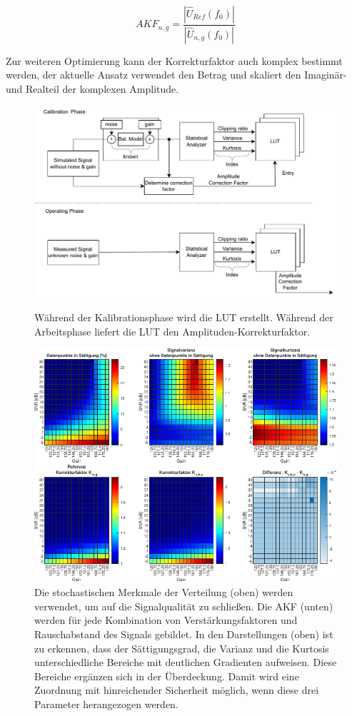 \begin{equation}
	\label{eq:corr}
	AKF_{n,g} = \frac{|\hat{U}_{Ref}(f_0)|}{|\hat{U}_{n,g}(f_0)|}
\end{equation}

Zur weiteren Optimierung kann der Korrekturfaktor auch komplex bestimmt werden, der aktuelle Ansatz verwendet den Betrag und skaliert den Imaginär- und Realteil der komplexen Amplitude.

\begin{figure}[h!]
	\centering
	\includegraphics[width=.85\textwidth]{../img/factor.pdf}
	\caption{Während der Kalibrationsphase wird die LUT erstellt. Während der Arbeitsphase liefert die LUT den Amplituden-Korrekturfaktor.}
	\label{fig:factor_eval} 
%
	\centering
	\includegraphics[width=.85\textwidth]{../img/lut.pdf}
	\caption{Die stochastischen Merkmale der Verteilung (oben) werden verwendet, um auf die Signalqualität zu schließen. Die AKF (unten) werden für jede Kombination von Verstärkungsfaktoren und Rauschabstand des Signals gebildet. In den Darstellungen (oben) ist zu erkennen, dass der Sättigungsgrad, die Varianz und die Kurtosis unterschiedliche Bereiche mit deutlichen Gradienten aufweisen. Diese Bereiche ergänzen sich in der Überdeckung. Damit wird eine Zuordnung mit hinreichender Sicherheit möglich, wenn diese drei Parameter herangezogen werden.}
	\label{fig:lut} 
\end{figure}

